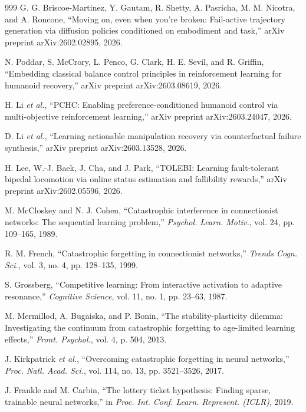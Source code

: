 \documentclass[12pt,a4paper,oneside]{report}
\begin{document}
\begin{thebibliography}{999}
G. G. Briscoe-Martinez, Y. Gautam, R. Shetty, A. Pasricha, M. M. Nicotra, and A. Roncone, ``Moving on, even when you're broken: Fail-active trajectory generation via diffusion policies conditioned on embodiment and task,'' arXiv preprint arXiv:2602.02895, 2026.

N. Poddar, S. McCrory, L. Penco, G. Clark, H. E. Sevil, and R. Griffin, ``Embedding classical balance control principles in reinforcement learning for humanoid recovery,'' arXiv preprint arXiv:2603.08619, 2026.

H. Li \textit{et al.}, ``{PCHC}: Enabling preference-conditioned humanoid control via multi-objective reinforcement learning,'' arXiv preprint arXiv:2603.24047, 2026.

D. Li \textit{et al.}, ``Learning actionable manipulation recovery via counterfactual failure synthesis,'' arXiv preprint arXiv:2603.13528, 2026.

H. Lee, W.-J. Baek, J. Cha, and J. Park, ``{TOLEBI}: Learning fault-tolerant bipedal locomotion via online status estimation and fallibility rewards,'' arXiv preprint arXiv:2602.05596, 2026.

M. McCloskey and N. J. Cohen, ``Catastrophic interference in connectionist networks: The sequential learning problem,'' \textit{Psychol. Learn. Motiv.}, vol. 24, pp. 109--165, 1989.

R. M. French, ``Catastrophic forgetting in connectionist networks,'' \textit{Trends Cogn. Sci.}, vol. 3, no. 4, pp. 128--135, 1999.

S. Grossberg, ``Competitive learning: From interactive activation to adaptive resonance,'' \textit{Cognitive Science}, vol. 11, no. 1, pp. 23--63, 1987.

M. Mermillod, A. Bugaiska, and P. Bonin, ``The stability-plasticity dilemma: Investigating the continuum from catastrophic forgetting to age-limited learning effects,'' \textit{Front. Psychol.}, vol. 4, p. 504, 2013.

J. Kirkpatrick \textit{et al.}, ``Overcoming catastrophic forgetting in neural networks,'' \textit{Proc. Natl. Acad. Sci.}, vol. 114, no. 13, pp. 3521--3526, 2017.

J. Frankle and M. Carbin, ``The lottery ticket hypothesis: Finding sparse, trainable neural networks,'' in \textit{Proc. Int. Conf. Learn. Represent. (ICLR)}, 2019.


\end{thebibliography}
\end{document}
